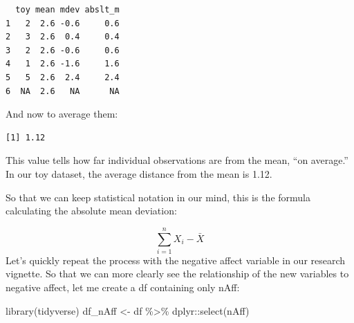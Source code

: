 \documentclass[
  11pt,
]{book}
\newenvironment{Shaded}{\begin{snugshade}}{\end{snugshade}}
\newcommand{\AttributeTok}[1]{\textcolor[rgb]{0.77,0.63,0.00}{#1}}
\newcommand{\ConstantTok}[1]{\textcolor[rgb]{0.00,0.00,0.00}{#1}}
\newcommand{\DecValTok}[1]{\textcolor[rgb]{0.00,0.00,0.81}{#1}}
\newcommand{\FunctionTok}[1]{\textcolor[rgb]{0.00,0.00,0.00}{#1}}
\newcommand{\NormalTok}[1]{#1}
\newcommand{\OtherTok}[1]{\textcolor[rgb]{0.56,0.35,0.01}{#1}}
\newcommand{\SpecialCharTok}[1]{\textcolor[rgb]{0.00,0.00,0.00}{#1}}
\begin{document}
\begin{verbatim}
  toy mean mdev abslt_m
1   2  2.6 -0.6     0.6
2   3  2.6  0.4     0.4
3   2  2.6 -0.6     0.6
4   1  2.6 -1.6     1.6
5   5  2.6  2.4     2.4
6  NA  2.6   NA      NA
\end{verbatim}

And now to average them:

\begin{Shaded}
\end{Shaded}

\begin{verbatim}
[1] 1.12
\end{verbatim}

This value tells how far individual observations are from the mean, ``on average.'' In our toy dataset, the average distance from the mean is 1.12.

So that we can keep statistical notation in our mind, this is the formula calculating the absolute mean deviation:

\[\sum_{i=1}^{n}X_{i} - \bar{X}\]
Let's quickly repeat the process with the negative affect variable in our research vignette. So that we can more clearly see the relationship of the new variables to negative affect, let me create a df containing only nAff:

\begin{Shaded}
\begin{Highlighting}[]
\FunctionTok{library}\NormalTok{(tidyverse)}
\NormalTok{df\_nAff }\OtherTok{\textless{}{-}}\NormalTok{ df }\SpecialCharTok{\%\textgreater{}\%}
\NormalTok{    dplyr}\SpecialCharTok{::}\FunctionTok{select}\NormalTok{(nAff)}
\end{Highlighting}
\end{Shaded}

\begin{Shaded}
\end{Shaded}
\end{document}
